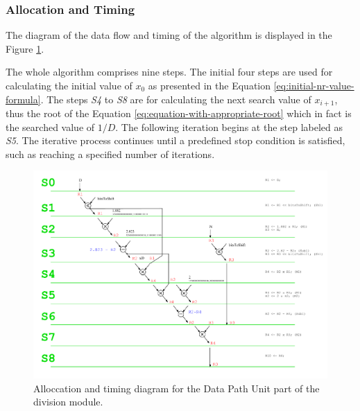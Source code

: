 \documentclass[a4paper, twoside, 11pt]{article}
\newcommand{\fbar}{\FloatBarrier}
\begin{document}
\subsubsection{Allocation and Timing}\label{subsubsec:division-allocation-and-timing}
The diagram of the data flow and timing of the algorithm is displayed in the Figure \ref{fig:division-allocation-timing}.\par
The whole algorithm comprises nine steps. The initial four steps are used for calculating the initial value of $x_0$ as presented in the Equation \ref{eq:initial-nr-value-formula}. The steps \textit{S4} to \textit{S8} are for calculating the next search value of $x_{i+1}$, thus the root of the Equation \ref{eq:equation-with-appropriate-root} which in fact is the searched value of $1/D$. The following iteration begins at the step labeled as \textit{S5}. The iterative process continues until a predefined stop condition is satisfied, such as reaching a specified number of iterations.
\begin{figure}[htbp!]
  \centering
  \includegraphics[width=1\textwidth]{src/pdf/allocation-timing.pdf}
   \caption{Alloccation and timing diagram for the Data Path Unit part of the division module.}
  \label{fig:division-allocation-timing}
\end{figure}

\fbar
\end{document}
